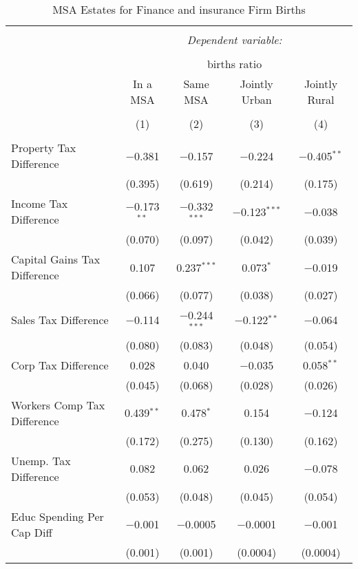 
\begin{table}[!htbp] \centering 
  \caption{MSA Estates for  Finance and insurance Firm Births} 
  \label{} 
\begin{tabular}{@{\extracolsep{5pt}}lcccc} 
\\[-1.8ex]\hline 
\hline \\[-1.8ex] 
 & \multicolumn{4}{c}{\textit{Dependent variable:}} \\ 
\cline{2-5} 
\\[-1.8ex] & \multicolumn{4}{c}{births ratio} \\ 
 & In a MSA & Same MSA & Jointly Urban & Jointly Rural \\ 
\\[-1.8ex] & (1) & (2) & (3) & (4)\\ 
\hline \\[-1.8ex] 
 Property Tax Difference & $-$0.381 & $-$0.157 & $-$0.224 & $-$0.405$^{**}$ \\ 
  & (0.395) & (0.619) & (0.214) & (0.175) \\ 
  Income Tax Difference & $-$0.173$^{**}$ & $-$0.332$^{***}$ & $-$0.123$^{***}$ & $-$0.038 \\ 
  & (0.070) & (0.097) & (0.042) & (0.039) \\ 
  Capital Gains Tax Difference & 0.107 & 0.237$^{***}$ & 0.073$^{*}$ & $-$0.019 \\ 
  & (0.066) & (0.077) & (0.038) & (0.027) \\ 
  Sales Tax Difference & $-$0.114 & $-$0.244$^{***}$ & $-$0.122$^{**}$ & $-$0.064 \\ 
  & (0.080) & (0.083) & (0.048) & (0.054) \\ 
  Corp Tax Difference & 0.028 & 0.040 & $-$0.035 & 0.058$^{**}$ \\ 
  & (0.045) & (0.068) & (0.028) & (0.026) \\ 
  Workers Comp Tax Difference & 0.439$^{**}$ & 0.478$^{*}$ & 0.154 & $-$0.124 \\ 
  & (0.172) & (0.275) & (0.130) & (0.162) \\ 
  Unemp. Tax Difference & 0.082 & 0.062 & 0.026 & $-$0.078 \\ 
  & (0.053) & (0.048) & (0.045) & (0.054) \\ 
  Educ Spending Per Cap Diff & $-$0.001 & $-$0.0005 & $-$0.0001 & $-$0.001 \\ 
  & (0.001) & (0.001) & (0.0004) & (0.0004) \\ 

\end{tabular}
\end{table}
